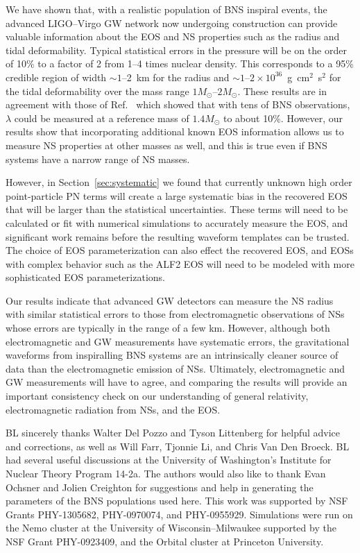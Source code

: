 \documentclass[twocolumn,prd,amssymb,aps,nofootinbib,showpacs,epsf]{revtex4}
\begin{document}
We have shown that, with a realistic population of BNS inspiral events, the advanced LIGO--Virgo GW network now undergoing construction can provide valuable information about the EOS and NS properties such as the radius and tidal deformability. Typical statistical errors in the pressure will be on the order of 10\% to a factor of 2 from 1--4 times nuclear density. This corresponds to a 95\% credible region of width $\sim 1$--2~km for the radius and $\sim 1$--$2\times 10^{36}$~g~cm$^2$~s$^2$ for the tidal deformability over the mass range $1M_\odot$--$2M_\odot$. These results are in agreement with those of Ref.~\cite{DelPozzoLiAgathos2013} which showed that with tens of BNS observations, $\lambda$ could be measured at a reference mass of $1.4M_\odot$ to about 10\%. However, our results show that incorporating additional known EOS information allows us to measure NS properties at other masses as well, and this is true even if BNS systems have a narrow range of NS masses.

However, in Section~\ref{sec:systematic} we found that currently unknown high order point-particle PN terms will create a large systematic bias in the recovered EOS that will be larger than the statistical uncertainties. These terms will need to be calculated or fit with numerical simulations to accurately measure the EOS, and significant work remains before the resulting waveform templates can be trusted. The choice of EOS parameterization can also effect the recovered EOS, and EOSs with complex behavior such as the ALF2 EOS will need to be modeled with more sophisticated EOS parameterizations. 

Our results indicate that advanced GW detectors can measure the NS radius with similar statistical errors to those from electromagnetic observations of NSs whose errors are typically in the range of a few km. However, although both electromagnetic and GW measurements have systematic errors, the gravitational waveforms from inspiralling BNS systems are an intrinsically cleaner source of data than the electromagnetic emission of NSs. Ultimately, electromagnetic and GW measurements will have to agree, and comparing the results will provide an important consistency check on our understanding of general relativity, electromagnetic radiation from NSs, and the EOS.
 
\acknowledgements

BL sincerely thanks Walter Del Pozzo and Tyson Littenberg for helpful advice and corrections, as well as Will Farr, Tjonnie Li, and Chris Van Den Broeck. BL had several useful discussions at the University of Washington's Institute for Nuclear Theory Program 14-2a. The authors would also like to thank Evan Ochsner and Jolien Creighton for suggestions and help in generating the parameters of the BNS populations used here. This work was supported by NSF Grants PHY-1305682, PHY-0970074, and PHY-0955929. Simulations were run on the Nemo cluster at the University of Wisconsin--Milwaukee supported by the NSF Grant PHY-0923409, and the Orbital cluster at Princeton University.


\end{document}
